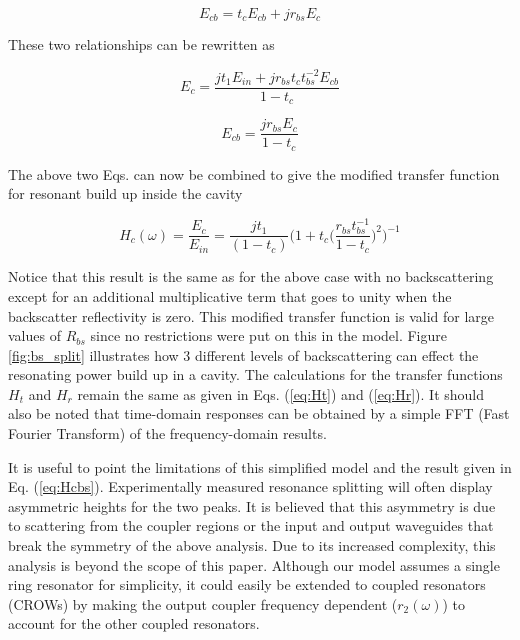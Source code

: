 \documentclass[10pt]{article}
\begin{document}
\begin{equation} 
E_{cb} = t_c E_{cb} + j r_{bs} E_c 
\end{equation}  

These two relationships can be rewritten as  

\begin{equation} E_c = \frac{j t_1 E_{in} + j r_{bs} t_c t_{bs}^{-2} E_{cb} }{1-t_c} \end{equation} 

\begin{equation} E_{cb} = \frac{j r_{bs} E_{c} }{1-t_c} \end{equation} 

The above two Eqs. can now be combined to give the modified transfer function for resonant build up inside the cavity 

\begin{equation} 
\boxed{H_c (\omega) =  \frac{E_c}{E_{in}} = \frac{j t_1 }{(1-t_c)}  \bigg( 1+t_c \Big(\frac{r_{bs} t_{bs}^{-1}}{1-t_c}\Big)^2  \bigg)^{-1}}
\label{eq:Hcbs} 
\end{equation} 

Notice that this result is the same as for the above case with no backscattering except for an additional multiplicative term that goes to unity when the backscatter reflectivity is zero.
This modified transfer function is valid for  large values of $R_{bs}$ since no restrictions were put on this in the model.
Figure \ref{fig:bs_split} illustrates how 3 different levels of backscattering can effect the resonating  power build up in a cavity.
The calculations for the transfer functions  $H_t$ and  $H_r$  remain the same as given in Eqs. (\ref{eq:Ht}) and (\ref{eq:Hr}). It should also be noted that time-domain responses can be obtained by a simple FFT (Fast Fourier Transform) of the frequency-domain results.


It is useful to point the limitations of this simplified model and the result given in Eq. (\ref{eq:Hcbs}).  Experimentally measured resonance splitting will often display asymmetric heights for the two peaks.  It is believed that this asymmetry is due to scattering from the coupler regions or the input and output waveguides that break the symmetry of the above analysis. Due to its increased complexity, this analysis is beyond the scope of this paper.
Although our model assumes a single ring resonator for simplicity, it could easily be extended to coupled resonators (CROWs) \cite{Melloni2010} by making the output coupler frequency dependent ($r_2(\omega)$) to account for the other coupled resonators.
\end{document}
